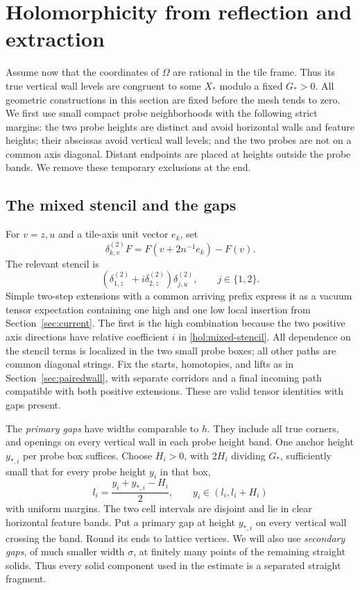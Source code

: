 \section{Holomorphicity from reflection and extraction}
\label{sec:holomorphic}

Assume now that the coordinates of $\Omega$ are rational in the tile
frame.  Thus its true vertical wall levels are congruent to some $X_*$
modulo a fixed $G_*>0$.  All geometric constructions in this section
are fixed before the mesh tends to zero.  We first use small compact
probe neighborhoods with the following strict margins: the two probe
heights are distinct and avoid horizontal walls and feature heights;
their abscissas avoid vertical wall levels; and the two probes are not
on a common axis diagonal.  Distant endpoints are placed at heights
outside the probe bands.  We remove these temporary exclusions at
the end.

\subsection{The mixed stencil and the gaps}

For $v=z,u$ and a tile-axis unit vector $e_k$, set
\begin{equation}
 \delta_{k,v}^{(2)}F=F(v+2n^{-1}e_k)-F(v).
 \label{hol:two-step}
\end{equation}
The relevant stencil is
\begin{equation}
 (\delta_{1,z}^{(2)}+i\delta_{2,z}^{(2)})\delta_{j,u}^{(2)},
 \qquad j\in\{1,2\}.
 \label{hol:mixed-stencil}
\end{equation}
Simple two-step extensions with a common arriving prefix express it
as a vacuum tensor expectation containing one high and one low local
insertion from Section~\ref{sec:current}.  The first is the high
combination because the two positive axis directions have relative
coefficient $i$ in \eqref{hol:mixed-stencil}.  All dependence on the
stencil terms is localized in the two small probe boxes; all other
paths are common diagonal strings.  Fix the starts, homotopies, and
lifts as in Section~\ref{sec:pairedwall}, with separate corridors and
a final incoming path compatible with both positive extensions.
These are valid tensor identities with gaps present.

The \emph{primary gaps} have widths comparable to $h$.  They include
all true corners, and openings on every vertical wall in each probe
height band.  One anchor height $y_{*,i}$ per probe box suffices.
Choose $H_i>0$, with $2H_i$ dividing $G_*$, sufficiently small that
for every probe height $y_i$ in that box,
\begin{equation}
 l_i=\frac{y_i+y_{*,i}-H_i}{2},\qquad
 y_i\in(l_i,l_i+H_i)
 \label{hol:marker-cell}
\end{equation}
with uniform margins.  The two cell intervals are disjoint and lie in
clear horizontal feature bands.  Put a primary gap at height $y_{*,i}$
on every vertical wall crossing the band.  Round its ends to lattice
vertices.  We will also use \emph{secondary gaps}, of much smaller
width $\sigma$, at finitely many points of the remaining straight
solids.  Thus every solid component used in the estimate is a separated
straight fragment.

